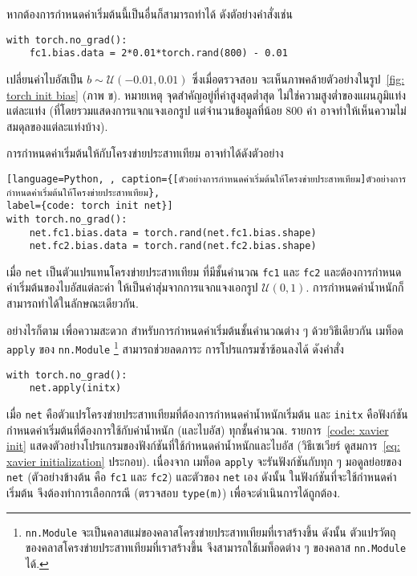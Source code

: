 หากต้องการกำหนดค่าเริ่มต้นนี้เป็นอื่นก็สามารถทำได้ ดังตัอย่างคำสั่งเช่น
\begin{Verbatim}[fontsize=\small]
with torch.no_grad():        
    fc1.bias.data = 2*0.01*torch.rand(800) - 0.01
\end{Verbatim}
เปลี่ยนค่าไบอัสเป็น $b \sim \mathcal{U}(-0.01, 0.01)$
ซึ่งเมื่อตรวจสอบ จะเห็นภาพคล้ายตัวอย่างในรูป~\ref{fig: torch init bias} (ภาพ ข).
หมายเหตุ จุดสำคัญอยู่ที่ค่าสูงสุดต่ำสุด ไม่ใช่ความสูงต่ำของแผนภูมิแท่งแต่ละแท่ง (ที่โดยรวมแสดงการแจกแจงเอกรูป 
แต่จำนวนข้อมูลที่น้อย $800$ ค่า อาจทำให้เห็นความไม่สมดุลของแต่ละแท่งบ้าง).

การกำหนดค่าเริ่มต้นให้กับโครงข่ายประสาทเทียม
อาจทำได้ดังตัวอย่าง

\begin{lstlisting}[language=Python, , caption={[ตัวอย่างการกำหนดค่าเริ่มต้นให้โครงข่ายประสาทเทียม]ตัวอย่างการกำหนดค่าเริ่มต้นให้โครงข่ายประสาทเทียม}, 
label={code: torch init net}]
with torch.no_grad():        
    net.fc1.bias.data = torch.rand(net.fc1.bias.shape)
    net.fc2.bias.data = torch.rand(net.fc2.bias.shape)
\end{lstlisting}
เมื่อ \texttt{net} เป็นตัวแปรแทนโครงข่ายประสาทเทียม
ที่มีชั้นคำนวณ \texttt{fc1} และ \texttt{fc2}
และต้องการกำหนดค่าเริ่มต้นของไบอัสแต่ละค่า
ให้เป็นค่าสุ่มจากการแจกแจงเอกรูป $\mathcal{U}(0, 1)$.
การกำหนดค่าน้ำหนักก็สามารถทำได้ในลักษณะเดียวกัน.

อย่างไรก็ตาม เพื่อความสะดวก
สำหรับการกำหนดค่าเริ่มต้นชั้นคำนวณต่าง ๆ
ด้วยวิธีเดียวกัน
เมท็อด \texttt{apply} ของ \texttt{nn.Module}%
\footnote{%
\texttt{nn.Module} จะเป็นคลาสแม่ของคลาสโครงข่ายประสาทเทียมที่เราสร้างขึ้น
ดังนั้น ตัวแปรวัตถุของคลาสโครงข่ายประสาทเทียมที่เราสร้างขึ้น จึงสามารถใช้เมท็อดต่าง ๆ ของคลาส \texttt{nn.Module} ได้.
}
สามารถช่วยลดภาระ การโปรแกรมซ้ำซ้อนลงได้
ดังคำสั่ง
\begin{Verbatim}[fontsize=\small]
with torch.no_grad():        
    net.apply(initx)
\end{Verbatim}
เมื่อ \texttt{net} คือตัวแปรโครงข่ายประสาทเทียมที่ต้องการกำหนดค่าน้ำหนักเริ่มต้น
และ \verb|initx|
คือฟังก์ชันกำหนดค่าเริ่มต้นที่ต้องการใช้กับค่าน้ำหนัก (และไบอัส) ทุกชั้นคำนวณ.
รายการ~\ref{code: xavier init}
แสดงตัวอย่างโปรแกรมของฟังก์ชันที่ใช้กำหนดค่าน้ำหนักและไบอัส (วิธีเซเวียร์ ดูสมการ~\ref{eq: xavier initialization} ประกอบ).
เนื่องจาก เมท็อด \texttt{apply} จะรันฟังก์ชันกับทุก ๆ มอดูลย่อยของ \texttt{net} (ตัวอย่างข้างต้น คือ \texttt{fc1} และ \texttt{fc2}) และตัวของ \texttt{net} เอง 
ดังนั้น ในฟังก์ชันที่จะใช้กำหนดค่าเริ่มต้น 
จึงต้องทำการเลือกกรณี (ตรวจสอบ \texttt{type(m)})
เพื่อจะดำเนินการได้ถูกต้อง.
	
